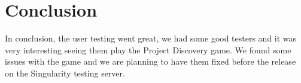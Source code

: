 \section{Conclusion}\label{sec:conclusion}
In conclusion, the user testing went great, we had some good testers and it was very interesting seeing them play the Project Discovery game. We found some issues with the game and we are planning to have them fixed before the release on the Singularity testing server. 